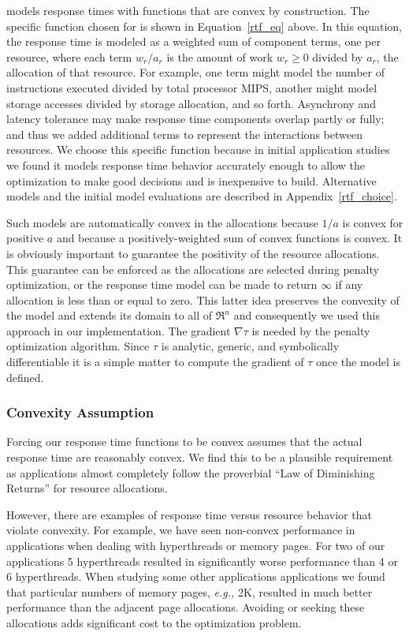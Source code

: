 \pacora models response times with functions that are convex by construction.  The specific function chosen for \pacora is shown in Equation~\ref{rtf_eq} above.  In this equation, the response time is modeled as a weighted sum of component terms, one per resource, where each term $w_r/a_r$ is the amount of work $w_r \geq 0$ divided by $a_r$, the allocation of that resource\cite{Snav}. For example, one term might model the number of instructions executed divided by total processor MIPS, another might model storage accesses divided by storage allocation, and so forth. Asynchrony and latency tolerance may make response time components overlap partly or fully; and thus we added additional terms to represent the interactions between resources. We choose this specific function because in initial application studies we found it models response time behavior accurately enough to allow the optimization to make good decisions and is inexpensive to build.  Alternative models and the initial model evaluations are described in Appendix~\ref{rtf_choice}.

Such models are automatically convex in the allocations because $1/a$ is convex for positive $a$ and because a positively-weighted sum of convex functions is convex.  It is obviously important to guarantee the positivity of the resource allocations. This guarantee can be enforced as the allocations are selected during penalty optimization, or the response time model can be made to return $\infty$ if any allocation is less than or equal to zero. This latter idea preserves the convexity of the model and extends its domain to all of $\Re^n$ and consequently we used this approach in our implementation. The gradient $\nabla\tau$ is needed by the penalty optimization algorithm.
Since $\tau$ is analytic, generic, and symbolically differentiable
it is a simple matter to compute the gradient of $\tau$ once the model is defined.

\subsubsection*{Convexity Assumption} Forcing our response time functions to be convex assumes that the actual response time are reasonably convex. We find this to be a plausible requirement as applications almost completely follow the proverbial ``Law of Diminishing Returns'' for resource allocations.

However, there are examples of response time versus resource behavior that violate convexity.   For example, we have seen non-convex performance in applications when dealing with hyperthreads or memory pages.  For two of our applications 5 hyperthreads resulted in significantly worse performance than 4 or 6 hyperthreads.  When studying some other applications applications we found that particular numbers of memory pages, \emph{e.g.,} 2K, resulted in much better performance than the adjacent page allocations.  Avoiding or seeking these allocations adds significant cost to the optimization problem.


